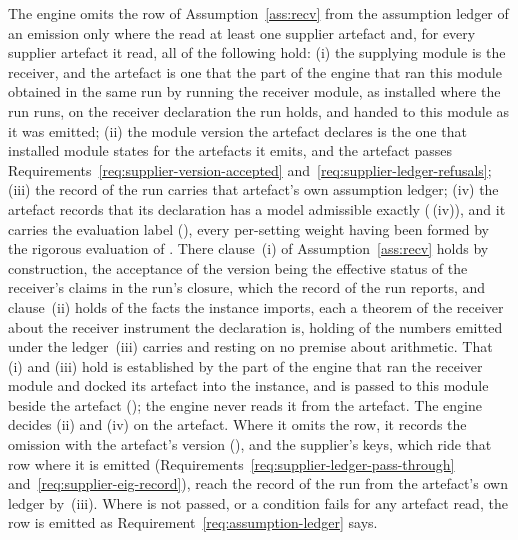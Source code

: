 \begin{requirement}\label{req:recv-row-provenance}
The engine omits the row of Assumption~\ref{ass:recv} from the assumption
ledger  of an emission only where the
 read at least one supplier artefact and, for every
supplier artefact it read, all of the following hold:
(i) the supplying module is the receiver, and the artefact is one that the
part of the engine that ran this module obtained in the same run by running
the receiver module, as installed where the run runs, on the receiver
declaration the run holds, and handed to this module as it was emitted;
(ii) the module version  the artefact declares is the
one that installed module states for the artefacts it emits, and the
artefact passes Requirements~\ref{req:supplier-version-accepted}
and~\ref{req:supplier-ledger-refusals};
(iii) the record of the run carries that artefact's own assumption ledger;
(iv) the artefact records that its declaration has a model admissible
exactly (\,(iv)), and it carries the
evaluation label  (),
every per-setting weight having been formed by the rigorous evaluation of
.
There clause~(i) of Assumption~\ref{ass:recv} holds by construction, the
acceptance of the version being the effective status of the receiver's
claims in the run's closure, which the record of the run reports, and
clause~(ii) holds of the facts the instance imports, each a theorem of the
receiver about the receiver instrument the declaration is, holding of the
numbers emitted under the ledger~(iii) carries and resting on no premise
about arithmetic. That (i) and (iii) hold is established by the part of the
engine that ran the receiver module and docked its artefact into the
instance, and is passed to this module beside the artefact
(); the engine never reads it from the artefact.
The engine decides (ii) and (iv) on the artefact. Where it omits the row, it
records the omission with the artefact's version
(), and the supplier's keys, which
ride that row where it is emitted
(Requirements~\ref{req:supplier-ledger-pass-through}
and~\ref{req:supplier-eig-record}), reach the record of the run from the
artefact's own ledger by~(iii). Where  is not
passed, or a condition fails for any artefact read, the row is emitted as
Requirement~\ref{req:assumption-ledger} says.
\end{requirement}
